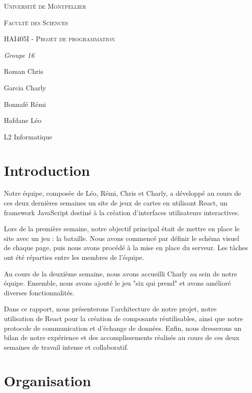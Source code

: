 \documentclass[a4paper]{article}
\begin{document}
\begin{titlepage}
\centering
\vspace*{0.5cm}
{\scshape\LARGE Université de Montpellier \par}
\vspace{1cm}
{\scshape\Large Faculté des Sciences \par}
\vspace{1.5cm}
{\scshape\Huge HAI405I - Projet de programmation \par}
\vspace{2cm}
{\Large\itshape Groupe 16 \par}
\vspace{1cm}
{\Large Roman Chris \par}
{\Large Garcia Charly \par}
{\Large Bonnafé Rémi \par}
{\Large Hafdane Léo \par}
\vfill
L2 Informatique\par
\end{titlepage}

\section{Introduction}

Notre équipe, composée de Léo, Rémi, Chris et Charly, a développé au cours de ces deux dernières semaines un site de jeux de cartes en utilisant React, un framework JavaScript destiné à la création d'interfaces utilisateurs interactives.

Lors de la première semaine, notre objectif principal était de mettre en place le site avec un jeu : la bataille. Nous avons commencé par définir le schéma visuel de chaque page, puis nous avons procédé à la mise en place du serveur. Les tâches ont été réparties entre les membres de l'équipe.

Au cours de la deuxième semaine, nous avons accueilli Charly au sein de notre équipe. Ensemble, nous avons ajouté le jeu "six qui prend" et avons amélioré diverses fonctionnalités.

Dans ce rapport, nous présenterons l'architecture de notre projet, notre utilisation de React pour la création de composants réutilisables, ainsi que notre protocole de communication et d'échange de données. Enfin, nous dresserons un bilan de notre expérience et des accomplissements réalisés au cours de ces deux semaines de travail intense et collaboratif.

\section{Organisation}
\end{document}
